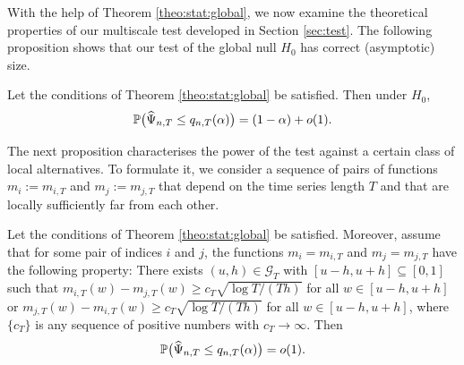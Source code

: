 \documentclass[12pt]{article}
\begin{document}
With the help of Theorem \ref{theo:stat:global}, we now examine the theoretical properties of our multiscale test developed in Section \ref{sec:test}. The following proposition shows that our test of the global null $H_0$ has correct (asymptotic) size.
\begin{prop}\label{prop:test}
Let the conditions of Theorem \ref{theo:stat:global} be satisfied. Then under $H_0$, 
\[ \mathbb{P} \big( \widehat{\Psi}_{n,T} \le q_{n,T}(\alpha) \big) = (1 - \alpha) + o(1). \]
\end{prop}
The next proposition characterises the power of the test against a certain class of local alternatives. To formulate it, we consider a sequence of pairs of functions $m_ i := m_{i,T}$ and $m_ j := m_{j,T}$ that depend on the time series length $T$ and that are locally sufficiently far from each other.
\begin{prop}\label{prop:test:power}
Let the conditions  of Theorem \ref{theo:stat:global} be satisfied. Moreover, assume that for some pair of indices $i$ and $j$, the functions $m_ i = m_{i,T}$ and $m_ j = m_{j,T}$ have the following property: There exists $(u, h) \in \mathcal{G}_T$ with $[u-h, u+h] \subseteq [0,1]$ such that $m_{i,T}(w) - m_{j,T}(w) \ge c_T \sqrt{\log T/(Th)}$ for all $w \in [u-h, u+h]$ or $m_{j,T}(w) - m_{i,T}(w) \ge c_T \sqrt{\log T/(Th)}$ for all $w \in [u-h, u+h]$, where $\{c_T\}$ is any sequence of positive numbers with $c_T \rightarrow \infty$. Then 
\[ \mathbb{P} \big( \widehat{\Psi}_{n,T} \le q_{n,T}(\alpha) \big) = o(1). \]
\end{prop}
\end{document}

